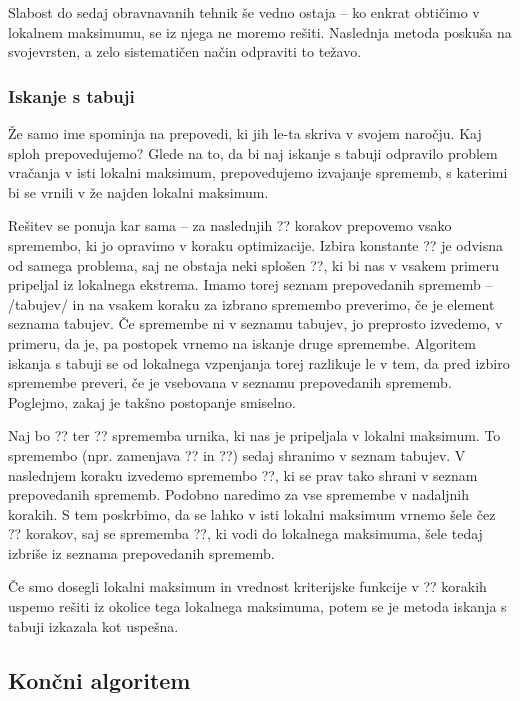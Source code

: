 \documentclass[a4paper,10pt]{article}
\begin{document}
   Slabost do sedaj obravnavanih tehnik še vedno ostaja -- ko enkrat obtičimo v lokalnem
   maksimumu, se iz njega ne moremo rešiti. Naslednja metoda poskuša na svojevrsten, a zelo
   sistematičen način odpraviti to težavo.
   
\subsubsection{   Iskanje s tabuji}
   
   Že samo ime spominja na prepovedi, ki jih le-ta skriva v svojem naročju. Kaj sploh prepovedujemo?
   Glede na to, da bi naj iskanje s tabuji odpravilo problem vračanja v isti lokalni maksimum,
   prepovedujemo izvajanje sprememb, s katerimi bi se vrnili v že najden lokalni maksimum.
   
   Rešitev se ponuja kar sama -- za naslednjih ?? korakov prepovemo vsako spremembo, ki jo
   opravimo v koraku optimizacije. Izbira konstante ?? je odvisna od samega problema, saj
   ne obstaja neki splošen ??, ki bi nas v vsakem primeru pripeljal iz lokalnega ekstrema.
   Imamo torej seznam prepovedanih sprememb -- /tabujev/ in na vsakem koraku za izbrano
   spremembo preverimo, če je element seznama tabujev. Če spremembe ni v seznamu tabujev, jo
   preprosto izvedemo, v primeru, da je, pa postopek vrnemo na iskanje druge spremembe.
   Algoritem iskanja s tabuji se od lokalnega vzpenjanja torej razlikuje le v tem, da pred
   izbiro spremembe preveri, če je vsebovana v seznamu prepovedanih sprememb. Poglejmo, zakaj
   je takšno postopanje smiselno.
   
   Naj bo ?? ter ?? sprememba urnika, ki nas je pripeljala v lokalni maksimum. To
   spremembo (npr. zamenjava ?? in ??) sedaj shranimo v
   seznam tabujev. V naslednjem koraku izvedemo spremembo ??, ki se prav tako shrani v
   seznam prepovedanih sprememb. Podobno naredimo za vse spremembe v nadaljnih korakih. S
   tem poskrbimo, da se lahko v isti lokalni maksimum vrnemo šele čez ?? korakov, saj
   se sprememba ??, ki vodi do lokalnega maksimuma, šele tedaj izbriše iz seznama
   prepovedanih sprememb.
   
   Če smo dosegli lokalni maksimum in vrednost kriterijske funkcije v ?? korakih uspemo
   rešiti iz okolice tega lokalnega maksimuma, potem se je metoda iskanja s tabuji izkazala
   kot uspešna.
   
\subsection{   Končni algoritem}
   
\end{document}
